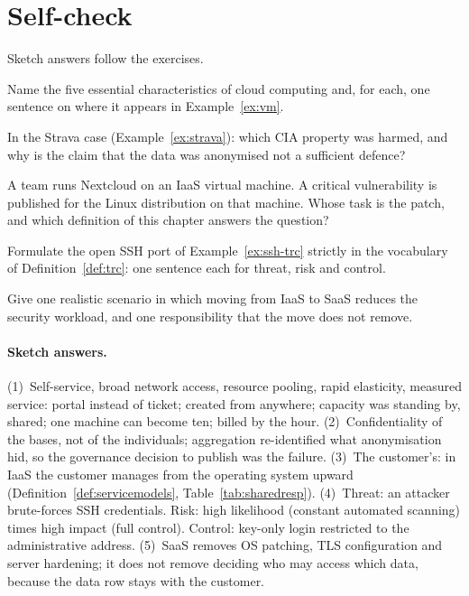 \section*{Self-check}

Sketch answers follow the exercises.

\begin{exercise}
Name the five essential characteristics of cloud computing and, for each, one
sentence on where it appears in Example~\ref{ex:vm}.
\end{exercise}

\begin{exercise}
In the Strava case (Example~\ref{ex:strava}): which CIA property was harmed,
and why is the claim that the data was anonymised not a sufficient defence?
\end{exercise}

\begin{exercise}
A team runs Nextcloud on an IaaS virtual machine. A critical vulnerability is
published for the Linux distribution on that machine. Whose task is the patch,
and which definition of this chapter answers the question?
\end{exercise}

\begin{exercise}
Formulate the open SSH port of Example~\ref{ex:ssh-trc} strictly in the
vocabulary of Definition~\ref{def:trc}: one sentence each for threat, risk and
control.
\end{exercise}

\begin{exercise}
Give one realistic scenario in which moving from IaaS to SaaS reduces the
security workload, and one responsibility that the move does not remove.
\end{exercise}

\paragraph{Sketch answers.}
{\small
(1)~Self-service, broad network access, resource pooling, rapid elasticity,
measured service: portal instead of ticket; created from anywhere; capacity
was standing by, shared; one machine can become ten; billed by the hour.
(2)~Confidentiality of the bases, not of the individuals; aggregation
re-identified what anonymisation hid, so the governance decision to publish was
the failure. (3)~The customer's: in IaaS the customer manages from the operating
system upward (Definition~\ref{def:servicemodels}, Table~\ref{tab:sharedresp}).
(4)~Threat: an attacker brute-forces SSH credentials. Risk: high likelihood
(constant automated scanning) times high impact (full control). Control:
key-only login restricted to the administrative address. (5)~SaaS removes OS
patching, TLS configuration and server hardening; it does not remove deciding
who may access which data, because the data row stays with the customer.}


